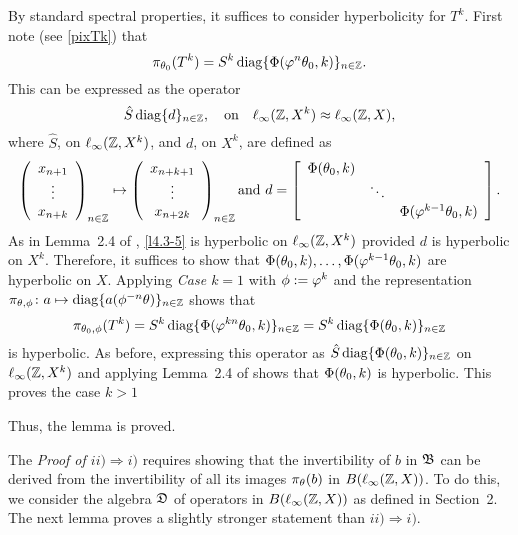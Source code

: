\begin{pf}
\begin{pf} By standard spectral properties, it
suffices to consider hyperbolicity for $T^k$.  First
 note (see \eqref{pixTk}) that
\[ \pi_{\theta_0}(T^k)
=S^k \operatorname{diag}\{\Phi(\varphi^n \theta_0,k)\}_{n\in{\Bbb{Z}}}.\]
This can be expressed as the operator
\begin{equation}\lb{l4.3-5}
\hat S\diag\{d\}_{n\in\bbZ},\quad\text{on}\quad
\ell_{\infty}(\bbZ,X^k)\approx\linf,
\end{equation}
 where $\hat S$, on $\ell_{\infty}({\Bbb{Z}},X^k)$, and $d$, on
$X^k$, are defined as
$$\left(\begin{array}{ccc}
x_{n+1}\\  \vdots  \\ x_{n+k}
\end{array}\right)_{n\in{\Bbb{Z}}}
\mapsto
\left(\begin{array}{ccc}
x_{n+k+1}\\  \vdots  \\ x_{n+2k}
\end{array}\right)_{n\in{\Bbb{Z}}}
\text{and }
d=\left[\begin{array}{ccc}
\Phi(\theta_0,k)&        &  \\
           & \ddots &  \\
           &        & \Phi(\varphi^{k-1}\theta_0,k)
\end{array}\right].
$$
As in Lemma~2.4 of \cite{LMS1}, \eqref{l4.3-5} is hyperbolic on
$\ell_{\infty}({\Bbb{Z}},X^k)$ provided $d$ is hyperbolic on $X^k$.
Therefore, it suffices to show that
$\Phi(\theta_0,k),\ldots,\Phi(\varphi^{k-1}\theta_0,k)$ are hyperbolic on $X$.
Applying {\em Case $k=1$} with $\phi:=\varphi^k$
and the representation
$\pi_{\theta,\phi}\colon a\mapsto \operatorname{diag}\{a(\phi^{-n}\theta)\}_{n\in{\Bbb{Z}}}$
shows that
\[ \pi_{\theta_0,\phi}(T^k)
=S^k\operatorname{diag}\{\Phi(\varphi^{kn}\theta_0,k)\}_{n\in{\Bbb{Z}}}
=S^k\operatorname{diag}\{\Phi(\theta_0,k)\}_{n\in{\Bbb{Z}}} \]
is hyperbolic.  As before, expressing this operator as
$\hat S\operatorname{diag}\{\Phi(\theta_0,k)\}_{n\in{\Bbb{Z}}}$ on
$\ell_{\infty}({\Bbb{Z}},X^k)$ and applying Lemma~2.4 of \cite{LMS1}
shows that $\Phi(\theta_0,k)$ is hyperbolic.  This proves the case
$k>1$
\end{pf}
Thus, the lemma is proved.
\end{pf}

The {\em Proof of $ii)\Rightarrow i)$} requires
showing that the invertibility of $b$ in ${\frak{B}}$ can be
derived from the invertibility of all its images $\pi_\theta(b)$ in
$B(\ell_\infty({\Bbb{Z}},X))$.  To do this,
we consider the algebra ${\frak{D}}$ of operators in $B(\ell_\infty({\Bbb{Z}},X))$ as
defined in Section~2.  The next lemma proves a slightly stronger
statement than $ii)\Rightarrow i)$.


